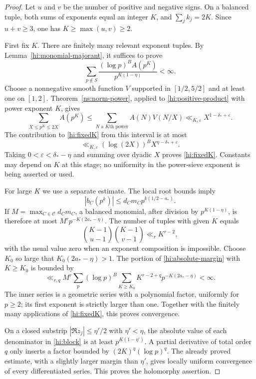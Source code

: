 \documentclass[11pt,reqno]{amsart}
\numberwithin{equation}{section}
\theoremstyle{definition}
\theoremstyle{remark}
\begin{document}
\begin{proof}
Let $u$ and $v$ be the number of positive and negative signs.  On a balanced
tuple, both sums of exponents equal an integer $K$, and $\sum_jk_j=2K$.
Since $u+v\geq3$, one has $K\geq\max(u,v)\geq2$.

First fix $K$.  There are finitely many relevant exponent tuples.  By
Lemma~\ref{hi:monomial-majorant}, it suffices to prove
\begin{equation}\label{hi:fixedK}
 \sum_{p\notin S}\frac{(\log p)^B A(p^K)}{p^{K(1-\eta)}}<\infty.
\end{equation}
Choose a nonnegative smooth function $V$ supported in $[1/2,5/2]$ and at
least one on $[1,2]$.  Theorem~\ref{ns:norm-power}, applied to
\eqref{hi:positive-product} with power exponent $K$, gives
\[
 \sum_{X\leq p^K\leq2X}A(p^K)
 \leq\sum_{N\text{ a }K\text{th power}}A(N)V(N/X)
 \ll_{K,\varepsilon}X^{1-\delta_*+\varepsilon}.
\]
The contribution to \eqref{hi:fixedK} from this interval is at most
\[
 \ll_{K,\varepsilon}(\log(2X))^B
 X^{\eta-\delta_*+\varepsilon}.
\]
Taking $0<\varepsilon<\delta_*-\eta$ and summing over dyadic $X$ proves
\eqref{hi:fixedK}.  Constants may depend on $K$ at this stage; no uniformity
in the power-sieve exponent is being asserted or used.

For large $K$ we use a separate estimate.  The local root bounds imply
\begin{equation}\label{hi:root-bound}
 |b_C(p^k)|\leq d_Cm_Cp^{k(1/2-a_*)}.
\end{equation}
If $M=\max_{C\in\mathcal C}d_Cm_C$, a balanced monomial, after division by
$p^{K(1-\eta)}$, is therefore at most
$M^r p^{-K(2a_*-\eta)}$.  The number of tuples with given $K$ equals
\[
 \binom{K-1}{u-1}\binom{K-1}{v-1}\ll_r K^{r-2},
\]
with the usual value zero when an exponent composition is impossible.
Choose $K_0$ so large that $K_0(2a_*-\eta)>1$.  The portion of
\eqref{hi:absolute-margin} with $K\geq K_0$ is bounded by
\[
 \ll_{r,q}M^r\sum_p(\log p)^B
 \sum_{K\geq K_0}K^{r-2+q}p^{-K(2a_*-\eta)}<\infty.
\]
The inner series is a geometric series with a polynomial factor, uniformly
for $p\geq2$; its first exponent is strictly larger than one.  Together with
the finitely many applications of \eqref{hi:fixedK}, this proves convergence.

On a closed substrip $|\Re z_j|\leq\eta'/2$ with $\eta'<\eta$, the absolute
value of each denominator in \eqref{hi:block} is at least
$p^{K(1-\eta')}$.  A partial derivative of total order $q$ only inserts a
factor bounded by $(2K)^q(\log p)^q$.  The already proved estimate, with a
slightly larger margin than $\eta'$, gives locally uniform convergence of
every differentiated series.  This proves the holomorphy assertion.
\end{proof}
\end{document}
